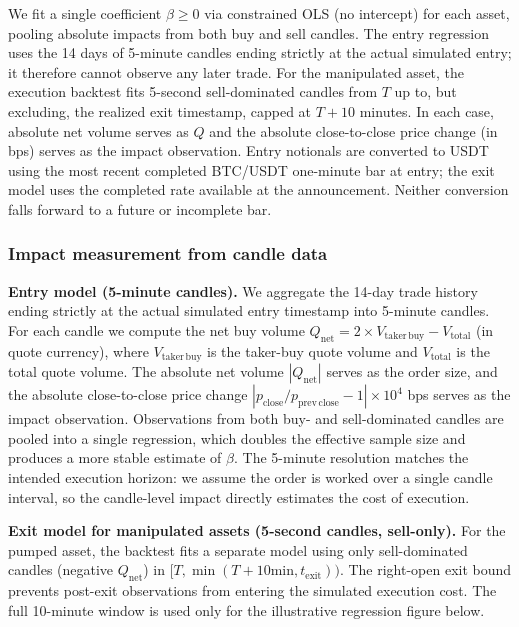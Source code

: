 \documentclass{ieeeaccess}
\begin{document}
We fit a single coefficient $\beta \geq 0$ via constrained OLS (no intercept) for each asset, pooling absolute impacts from both buy and sell candles. The entry regression uses the 14 days of 5-minute candles ending strictly at the actual simulated entry; it therefore cannot observe any later trade. For the manipulated asset, the execution backtest fits 5-second sell-dominated candles from $T$ up to, but excluding, the realized exit timestamp, capped at $T+10$ minutes. In each case, absolute net volume serves as $Q$ and the absolute close-to-close price change (in bps) serves as the impact observation. Entry notionals are converted to USDT using the most recent completed BTC/USDT one-minute bar at entry; the exit model uses the completed rate available at the announcement. Neither conversion falls forward to a future or incomplete bar.

\subsubsection{Impact measurement from candle data}
\textbf{Entry model (5-minute candles).} We aggregate the 14-day trade history ending strictly at the actual simulated entry timestamp into 5-minute candles. For each candle we compute the net buy volume $Q_{\mathrm{net}} = 2 \times V_{\mathrm{taker\,buy}} - V_{\mathrm{total}}$ (in quote currency), where $V_{\mathrm{taker\,buy}}$ is the taker-buy quote volume and $V_{\mathrm{total}}$ is the total quote volume. The absolute net volume $|Q_{\mathrm{net}}|$ serves as the order size, and the absolute close-to-close price change $|p_{\mathrm{close}} / p_{\mathrm{prev\,close}} - 1| \times 10^4$ bps serves as the impact observation. Observations from both buy- and sell-dominated candles are pooled into a single regression, which doubles the effective sample size and produces a more stable estimate of $\beta$. The 5-minute resolution matches the intended execution horizon: we assume the order is worked over a single candle interval, so the candle-level impact directly estimates the cost of execution.

\textbf{Exit model for manipulated assets (5-second candles, sell-only).} For the pumped asset, the backtest fits a separate model using only sell-dominated candles (negative $Q_{\mathrm{net}}$) in $[T,\min(T+10\mathrm{min},t_{\mathrm{exit}}))$. The right-open exit bound prevents post-exit observations from entering the simulated execution cost. The full 10-minute window is used only for the illustrative regression figure below.
\end{document}
